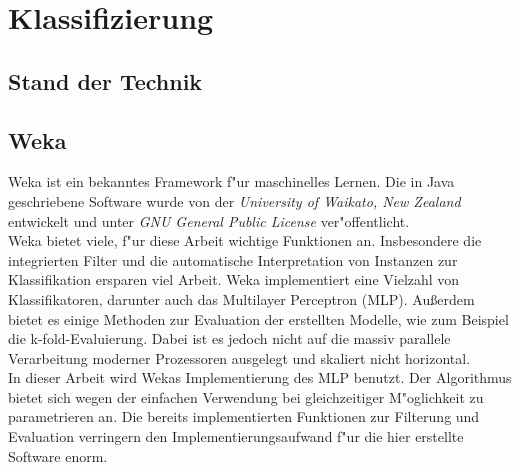 \section{Klassifizierung}
\label{Klassifizierung}

\subsection{Stand der Technik}
\label{Stand der Technik}

\subsection{Weka}
\label{Weka}
Weka ist ein bekanntes Framework f"ur maschinelles Lernen. Die in Java geschriebene Software wurde von der \textit{University of Waikato, New Zealand} entwickelt und unter \textit{GNU General Public License} ver"offentlicht. \\
Weka bietet viele, f"ur diese Arbeit wichtige Funktionen an. Insbesondere die integrierten Filter und die automatische Interpretation von Instanzen zur Klassifikation ersparen viel Arbeit. Weka implementiert eine Vielzahl von Klassifikatoren, darunter auch das Multilayer Perceptron (MLP).
Au{\ss}erdem bietet es einige Methoden zur Evaluation der erstellten Modelle, wie zum Beispiel die k-fold-Evaluierung. Dabei ist es jedoch nicht auf die massiv parallele Verarbeitung moderner Prozessoren ausgelegt und skaliert nicht horizontal.\\
In dieser Arbeit wird Wekas Implementierung des MLP benutzt. Der Algorithmus bietet sich wegen der einfachen Verwendung bei gleichzeitiger M"oglichkeit zu parametrieren an. Die bereits implementierten  Funktionen zur Filterung und Evaluation verringern den Implementierungsaufwand f"ur die hier erstellte Software enorm.

